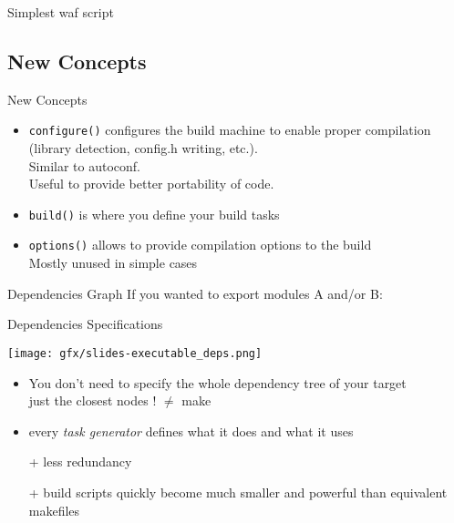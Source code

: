 \documentclass[xetex]{beamer}
\begin{document}
\begin{frame}[fragile]{Simplest waf script}
	\scriptsize
	
	
\end{frame}

\subsection{New Concepts}

\begin{frame}{New Concepts}
	\begin{itemize}
		\item \texttt{configure()} configures the build machine to enable proper compilation (library detection, config.h writing, etc.).\\
		Similar to autoconf.\\
		Useful to provide better portability of code.

		\item \texttt{build()} is where you define your build tasks

		\item \texttt{options()} allows to provide compilation options to the build\\
		Mostly unused in simple cases
	\end{itemize}
\end{frame}

\begin{frame}[fragile]{Dependencies Graph}
	If you wanted to export modules A and/or B:
	
\end{frame}


\begin{frame}{Dependencies Specifications}
	\begin{center}
		\texttt{[image: gfx/slides-executable\_deps.png]}
	\end{center}
	\begin{itemize}
		\item You don't need to specify the whole dependency tree of your target\\
		just the closest nodes ! $\neq$ make
		\item every \textit{task generator} defines what it does and what it uses
		\item[+] less redundancy
		\item[+] build scripts quickly become much smaller and powerful than equivalent makefiles
	\end{itemize}
\end{frame}
\end{document}
